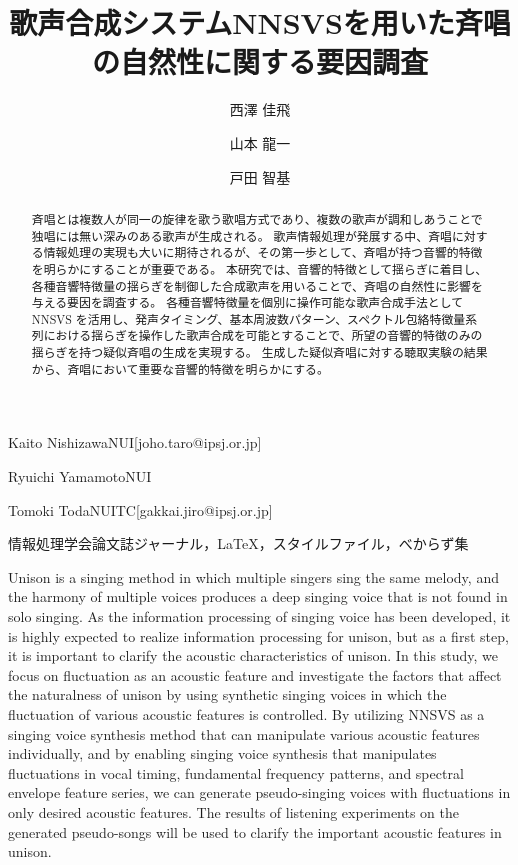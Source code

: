 \documentclass[submit]{ipsj}
\begin{document}
\title{歌声合成システムNNSVSを用いた斉唱の自然性に関する要因調査}





\author{西澤 佳飛}{Kaito Nishizawa}{NUI}[joho.taro@ipsj.or.jp]
\author{山本 龍一}{Ryuichi Yamamoto}{NUI}
\author{戸田 智基}{Tomoki Toda}{NUITC}[gakkai.jiro@ipsj.or.jp]

\begin{abstract}
斉唱とは複数人が同一の旋律を歌う歌唱方式であり、複数の歌声が調和しあうことで独唱には無い深みのある歌声が生成される。
歌声情報処理が発展する中、斉唱に対する情報処理の実現も大いに期待されるが、その第一歩として、斉唱が持つ音響的特徴を明らかにすることが重要である。
本研究では、音響的特徴として揺らぎに着目し、各種音響特徴量の揺らぎを制御した合成歌声を用いることで、斉唱の自然性に影響を与える要因を調査する。
各種音響特徴量を個別に操作可能な歌声合成手法としてNNSVS\cite{yamamoto2022nnsvs} を活用し、発声タイミング、基本周波数パターン、スペクトル包絡特徴量系列における揺らぎを操作した歌声合成を可能とすることで、所望の音響的特徴のみの揺らぎを持つ疑似斉唱の生成を実現する。
生成した疑似斉唱に対する聴取実験の結果から、斉唱において重要な音響的特徴を明らかにする。
\end{abstract}


\begin{jkeyword}
情報処理学会論文誌ジャーナル，\LaTeX，スタイルファイル，べからず集
\end{jkeyword}

\begin{eabstract}
Unison is a singing method in which multiple singers sing the same melody, and the harmony of multiple voices produces a deep singing voice that is not found in solo singing.
As the information processing of singing voice has been developed, it is highly expected to realize information processing for unison, but as a first step, it is important to clarify the acoustic characteristics of unison.
In this study, we focus on fluctuation as an acoustic feature and investigate the factors that affect the naturalness of unison by using synthetic singing voices in which the fluctuation of various acoustic features is controlled.
By utilizing NNSVS as a singing voice synthesis method that can manipulate various acoustic features individually, and by enabling singing voice synthesis that manipulates fluctuations in vocal timing, fundamental frequency patterns, and spectral envelope feature series, we can generate pseudo-singing voices with fluctuations in only desired acoustic features.
The results of listening experiments on the generated pseudo-songs will be used to clarify the important acoustic features in unison.
\end{eabstract}
\end{document}
